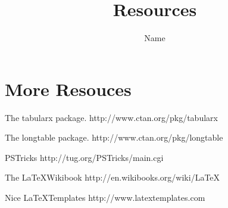 \documentclass{proc}
\title{Resources}
\author{Name}
\date{}
\begin{document}
\maketitle
\section{More Resouces}

The tabularx package. http://www.ctan.org/pkg/tabularx

The longtable package. http://www.ctan.org/pkg/longtable

PSTricks http://tug.org/PSTricks/main.cgi

The \LaTeX Wikibook http://en.wikibooks.org/wiki/LaTeX

Nice \LaTeX Templates http://www.latextemplates.com
\end{document}
